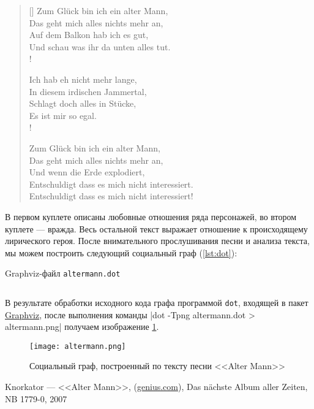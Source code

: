 \documentclass[a4paper,12pt,notitlepage]{article}
\begin{document}
\begin{verse}[\versewidth]
		Zum Glück bin ich ein alter Mann, \\
		Das geht mich alles nichts mehr an, \\
		Auf dem Balkon hab ich es gut, \\
		Und schau was ihr da unten alles tut. \\!

		Ich hab eh nicht mehr lange, \\
		In diesem irdischen Jammertal, \\
		Schlagt doch alles in Stücke, \\
		Es ist mir so egal. \\!
		
		Zum Glück bin ich ein alter Mann, \\
		Das geht mich alles nichts mehr an, \\
		Und wenn die Erde explodiert, \\
		Entschuldigt dass es mich nicht interessiert. \\
		Entschuldigt dass es mich nicht interessiert! \\
  \end{verse}
  
  В первом куплете описаны любовные отношения ряда персонажей, во втором куплете --- вражда. Весь остальной текст выражает отношение к происходящему лирического героя. После внимательного прослушивания песни и анализа текста, мы можем построить следующий социальный граф (\ref{lst:dot}):
  
    \begin{listing}[H]
      \caption{Graphviz-файл \texttt{altermann.dot}}
      \label{lst:dot}
      \inputminted[linenos]{dot}{altermann.dot}
    \end{listing}
    
    В результате обработки исходного кода графа программой \texttt{dot}, входящей в пакет \href{https://http://www.graphviz.org/}{Graphviz}, после выполнения команды |dot -Tpng altermann.dot > altermann.png| получаем изображение \ref{fig:graph}.
    
    
    \begin{figure}[ht]
      \centering
      \texttt{[image: altermann.png]}
      \caption{Социальный граф, построенный по тексту песни <<Alter Mann>>}
      \label{fig:graph}
    \end{figure}
    
    \newpage
    \listoflistings
    \listoffigures
    \begin{thebibliography}{1}
      Knorkator --- <<Alter Mann>>, (\href{https://genius.com/Knorkator-alter-mann-lyrics}{genius.com}), Das nächste Album aller Zeiten, NB 1779-0, 2007

\end{thebibliography}
    
    
  
      
\end{document}
